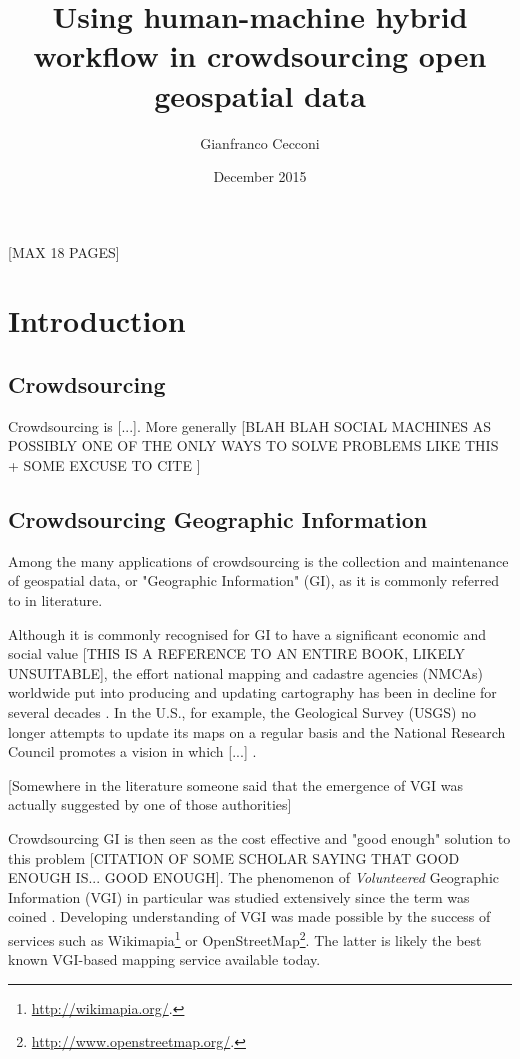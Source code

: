 \documentclass{llncs}
\title{Using human-machine hybrid workflow in crowdsourcing open geospatial data}
\author{Gianfranco Cecconi}
\institute{University of Southampton \email{gc1a13@soton.ac.uk}}
\date{December 2015}
\begin{document}
\maketitle

[MAX 18 PAGES]

\section{Introduction}

\subsection{Crowdsourcing}

    Crowdsourcing is {[}...{]}. More generally {[}BLAH BLAH SOCIAL MACHINES AS POSSIBLY ONE OF THE ONLY WAYS TO SOLVE PROBLEMS LIKE THIS + SOME EXCUSE TO CITE \cite{OReilly:2015uo}{]}

\subsection{Crowdsourcing Geographic Information}

    Among the many applications of crowdsourcing is the collection and maintenance of geospatial data, or "Geographic Information" (GI), as it is commonly referred to in literature.
    
    Although it is commonly recognised for GI to have a significant economic and social value \cite{Sui:2012uf}[THIS IS A REFERENCE TO AN ENTIRE BOOK, LIKELY UNSUITABLE], the effort national mapping and cadastre agencies (NMCAs) worldwide put into producing and updating cartography has been in decline for several decades \cite{ESTES:1994vz}. In the U.S., for example, the Geological Survey (USGS) no longer attempts to update its maps on a regular basis and the National Research Council promotes a vision in which {[}...{]} \cite{Committee:1993vp}.
    
    {[}Somewhere in the literature someone said that the emergence of VGI was actually suggested by one of those authorities{]}
    
    Crowdsourcing GI is then seen as the cost effective and "good enough" solution to this problem [CITATION OF SOME SCHOLAR SAYING THAT GOOD ENOUGH IS... GOOD ENOUGH]. The phenomenon of {\it Volunteered} Geographic Information (VGI) in particular was studied extensively since the term was coined \cite{Goodchild:2007vt}. Developing understanding of VGI was made possible by the success of services such as Wikimapia\footnote{\url{http://wikimapia.org/}.} or OpenStreetMap\footnote{\url{http://www.openstreetmap.org/}.}. The latter is likely the best known VGI-based mapping service available today.
\end{document}
